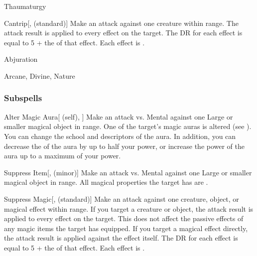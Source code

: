 \newpage
\begin{spellsection}{Thaumaturgy}


\begin{ability}{Cantrip}[,  (standard)]
Make an attack against one creature within \rngmed range.
The attack result is applied to every  effect on the target.
The DR for each effect is equal to 5 + the  of that effect.
\hit Each effect is .
\end{ability}




 Abjuration

 Arcane, Divine, Nature
\end{spellsection}


\subsubsection{Subspells}


\begin{ability}[\nth{1}]{Alter Magic Aura}[ (self), ]
Make an attack vs. Mental against one Large or smaller magical object in \rngmed range.
\hit One of the target's magic auras is altered (see ).
You can change the school and descriptors of the aura.
In addition, you can decrease the  of the aura by up to half your power, or increase the power of the aura up to a maximum of your power.
\end{ability}
\vspace{0.25em}


\begin{ability}[\nth{1}]{Suppress Item}[,  (minor)]
Make an attack vs. Mental against one Large or smaller magical object in \rngmed range.
\hit All magical properties the target has are .
\end{ability}
\vspace{0.25em}


\begin{ability}[\nth{1}]{Suppress Magic}[,  (standard)]
Make an attack against one creature, object, or magical effect within \rngmed range.
If you target a creature or object, the attack result is applied to every  effect on the target.
This does not affect the passive effects of any magic items the target has equipped.
If you target a magical effect directly, the attack result is applied against the effect itself.
The DR for each effect is equal to 5 + the  of that effect.
\hit Each effect is .
\end{ability}
\vspace{0.25em}


